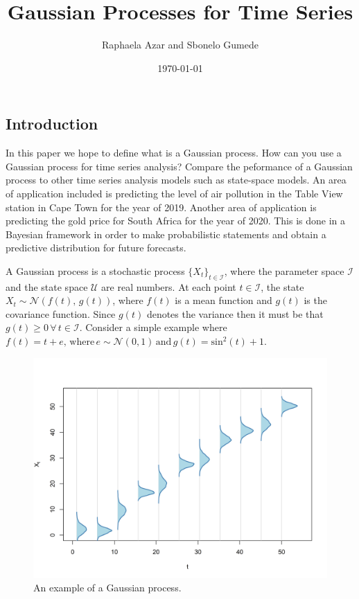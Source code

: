 \documentclass[a4paper, 10pt]{article}
\title{Gaussian Processes for Time Series}
\date{\today}
\author{Raphaela Azar and Sbonelo Gumede}
\begin{document}
   \maketitle

   \begin{flushleft}
   
   \section*{Introduction}

   In this paper we hope to define what is a Gaussian process. How can you use a Gaussian process for time series analysis? Compare the peformance of a Gaussian process to other time series analysis models such as state-space models. An area of application included is predicting the level of air pollution in the Table View station in Cape Town for the year of 2019. Another area of application is predicting the gold price for South Africa for the year of 2020. This is done in a Bayesian framework in order to make probabilistic statements and obtain a predictive distribution for future forecasts.

   \vspace{1em}

   A Gaussian process is a stochastic process $\{X_{t} \}_{t \in \mathcal{I}}$, where the parameter space $\mathcal{I}$ and the state space $\mathcal{U}$ are real numbers. At each point $t \in \mathcal{I}$, the state $X_{t} \sim \mathcal{N}(f(t), \, g(t))$, where $f(t)$ is a mean function and $g(t)$ is the covariance function. Since $g(t)$ denotes the variance then it must be that $g(t) \geq 0 \, \forall \, t \in \mathcal{I}$. Consider a simple example where $f(t) = t + e, \, \text{where} \, e \sim \mathcal{N}(0, 1) \, \text{and} \, g(t) = \text{sin}^{2}(t) + 1$.
   
   \begin{figure}[H]
            \raggedright
            \includegraphics[width=0.48\linewidth]{../images/gp.png}
            \caption{An example of a Gaussian process.}
   \end{figure}


\end{flushleft}
\end{document}
